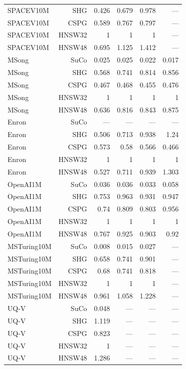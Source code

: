 \begin{table}[t]
\begin{tabular}{lrrrrr}
SPACEV10M & SHG & 0.426 & 0.679 & 0.978 & — \\
SPACEV10M & CSPG & 0.589 & 0.767 & 0.797 & — \\
SPACEV10M & HNSW32 & 1 & 1 & 1 & — \\
SPACEV10M & HNSW48 & 0.695 & 1.125 & 1.412 & — \\
MSong & SuCo & 0.025 & 0.025 & 0.022 & 0.017 \\
MSong & SHG & 0.568 & 0.741 & 0.814 & 0.856 \\
MSong & CSPG & 0.467 & 0.468 & 0.455 & 0.476 \\
MSong & HNSW32 & 1 & 1 & 1 & 1 \\
MSong & HNSW48 & 0.636 & 0.816 & 0.843 & 0.875 \\
Enron & SuCo & — & — & — & — \\
Enron & SHG & 0.506 & 0.713 & 0.938 & 1.24 \\
Enron & CSPG & 0.573 & 0.58 & 0.566 & 0.466 \\
Enron & HNSW32 & 1 & 1 & 1 & 1 \\
Enron & HNSW48 & 0.527 & 0.711 & 0.939 & 1.303 \\
OpenAI1M & SuCo & 0.036 & 0.036 & 0.033 & 0.058 \\
OpenAI1M & SHG & 0.753 & 0.963 & 0.931 & 0.947 \\
OpenAI1M & CSPG & 0.74 & 0.809 & 0.803 & 0.956 \\
OpenAI1M & HNSW32 & 1 & 1 & 1 & 1 \\
OpenAI1M & HNSW48 & 0.767 & 0.925 & 0.903 & 0.92 \\
MSTuring10M & SuCo & 0.008 & 0.015 & 0.027 & — \\
MSTuring10M & SHG & 0.658 & 0.741 & 0.901 & — \\
MSTuring10M & CSPG & 0.68 & 0.741 & 0.818 & — \\
MSTuring10M & HNSW32 & 1 & 1 & 1 & — \\
MSTuring10M & HNSW48 & 0.961 & 1.058 & 1.228 & — \\
UQ-V & SuCo & 0.048 & — & — & — \\
UQ-V & SHG & 1.119 & — & — & — \\
UQ-V & CSPG & 0.823 & — & — & — \\
UQ-V & HNSW32 & 1 & — & — & — \\
UQ-V & HNSW48 & 1.286 & — & — & — \\
\bottomrule
\end{tabular}
\end{table}
